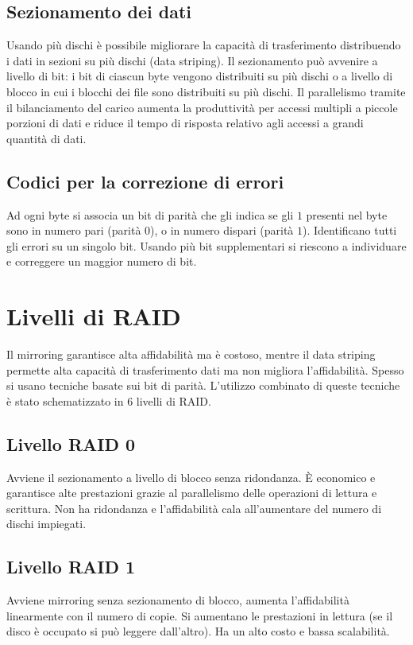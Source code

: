 \subsection{Sezionamento dei dati}
Usando pi\`u dischi \`e possibile migliorare la capacit\`a di trasferimento distribuendo i dati in sezioni su pi\`u dischi (data striping). Il sezionamento pu\`o avvenire a livello di 
bit: i bit di ciascun byte vengono distribuiti su pi\`u dischi o a livello di blocco in cui i blocchi dei file sono distribuiti su pi\`u dischi. Il parallelismo tramite il bilanciamento
del carico aumenta la produttivit\`a per accessi multipli a piccole porzioni di dati e riduce il tempo di risposta relativo agli accessi a grandi quantit\`a di dati. 
\subsection{Codici per la correzione di errori}
Ad ogni byte si associa un bit di parit\`a che gli indica se gli $1$ presenti nel byte sono in numero pari (parit\`a $0$), o in numero dispari (parit\`a $1$). Identificano tutti gli 
errori su un singolo bit. Usando pi\`u bit supplementari si riescono a individuare e correggere un maggior numero di bit. 
\section{Livelli di RAID}
Il mirroring garantisce alta affidabilit\`a ma \`e costoso, mentre il data striping permette alta capacit\`a di trasferimento dati ma non migliora l'affidabilit\`a. Spesso si usano
tecniche basate sui bit di parit\`a. L'utilizzo combinato di queste tecniche \`e stato schematizzato in $6$ livelli di RAID. 
\subsection{Livello RAID 0}
Avviene il sezionamento a livello di blocco senza ridondanza. \`E economico e garantisce alte prestazioni grazie al parallelismo delle operazioni di lettura e scrittura. Non ha 
ridondanza e l'affidabilit\`a cala all'aumentare del numero di dischi impiegati. 
\subsection{Livello RAID 1}
Avviene mirroring senza sezionamento di blocco, aumenta l'affidabilit\`a linearmente con il numero di copie. Si aumentano le prestazioni in lettura (se il disco \`e occupato si pu\`o 
leggere dall'altro). Ha un alto costo e bassa scalabilit\`a. 
